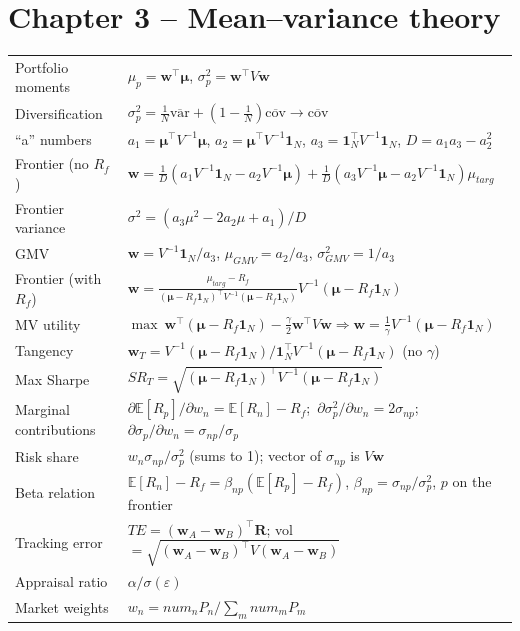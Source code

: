 \documentclass[11pt,a4paper]{report}
\newcommand{\E}{\mathbb{E}}
\newcommand{\one}{\mathbf{1}_N}
\newcommand{\w}{\bm{w}}
\newcommand{\R}{\bm{R}}
\newcommand{\T}{^{\top}}
\newcommand{\mub}{\bm{\mu}}
\begin{document}
{\section*{Chapter 3 -- Mean--variance theory}
\begin{tabularx}{\textwidth}{@{}lX@{}}
\toprule
Portfolio moments & $\mu_p=\w\T\mub$, $\sigma_p^2=\w\T V\w$ \\
Diversification & $\sigma_p^2=\frac1N\overline{\text{var}}+(1-\frac1N)\overline{\text{cov}}\to\overline{\text{cov}}$ \\
``a'' numbers & $a_1=\mub\T V^{-1}\mub$, $a_2=\mub\T V^{-1}\one$, $a_3=\one\T V^{-1}\one$, $D=a_1a_3-a_2^2$ \\
Frontier (no $R_f$) & $\w=\frac1D(a_1V^{-1}\one-a_2V^{-1}\mub)+\frac1D(a_3V^{-1}\mub-a_2V^{-1}\one)\mu_{targ}$ \\
Frontier variance & $\sigma^2=(a_3\mu^2-2a_2\mu+a_1)/D$ \\
GMV & $\w=V^{-1}\one/a_3$, $\mu_{GMV}=a_2/a_3$, $\sigma^2_{GMV}=1/a_3$ \\
Frontier (with $R_f$) & $\w=\frac{\mu_{targ}-R_f}{(\mub-R_f\one)\T V^{-1}(\mub-R_f\one)}V^{-1}(\mub-R_f\one)$ \\
MV utility & $\max\ \w\T(\mub-R_f\one)-\frac\gamma2\w\T V\w\Rightarrow\w=\frac1\gamma V^{-1}(\mub-R_f\one)$ \\
Tangency & $\w_T=V^{-1}(\mub-R_f\one)/\one\T V^{-1}(\mub-R_f\one)$ (no $\gamma$) \\
Max Sharpe & $SR_T=\sqrt{(\mub-R_f\one)\T V^{-1}(\mub-R_f\one)}$ \\
Marginal contributions & $\partial\E[R_p]/\partial w_n=\E[R_n]-R_f$;\ $\partial\sigma_p^2/\partial w_n=2\sigma_{np}$;\ $\partial\sigma_p/\partial w_n=\sigma_{np}/\sigma_p$ \\
Risk share & $w_n\sigma_{np}/\sigma_p^2$ (sums to 1); vector of $\sigma_{np}$ is $V\w$ \\
Beta relation & $\E[R_n]-R_f=\beta_{np}(\E[R_p]-R_f)$, $\beta_{np}=\sigma_{np}/\sigma_p^2$, $p$ on the frontier \\
Tracking error & $TE=(\w_A-\w_B)\T\R$; vol $=\sqrt{(\w_A-\w_B)\T V(\w_A-\w_B)}$ \\
Appraisal ratio & $\alpha/\sigma(\varepsilon)$ \\
Market weights & $w_n=num_nP_n/\sum_m num_mP_m$ \\
\bottomrule
\end{tabularx}

}
\end{document}

